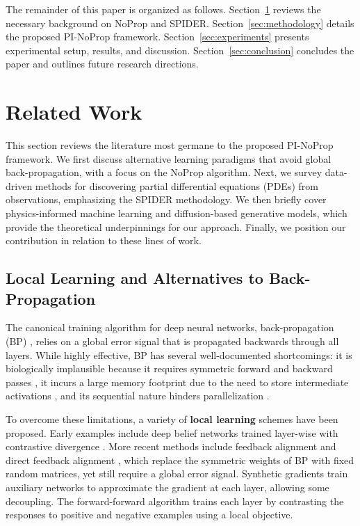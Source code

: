 \documentclass[preprint,12pt]{elsarticle}
\begin{document}
The remainder of this paper is organized as follows. Section~\ref{sec:related} reviews the necessary background on NoProp and SPIDER. Section~\ref{sec:methodology} details the proposed PI-NoProp framework. Section~\ref{sec:experiments} presents experimental setup, results, and discussion. Section~\ref{sec:conclusion} concludes the paper and outlines future research directions.


\section{Related Work}
\label{sec:related}

This section reviews the literature most germane to the proposed PI-NoProp framework. We first discuss alternative learning paradigms that avoid global back-propagation, with a focus on the NoProp algorithm. Next, we survey data-driven methods for discovering partial differential equations (PDEs) from observations, emphasizing the SPIDER methodology. We then briefly cover physics-informed machine learning and diffusion-based generative models, which provide the theoretical underpinnings for our approach. Finally, we position our contribution in relation to these lines of work.

\subsection{Local Learning and Alternatives to Back-Propagation}
\label{sec:local-learning}

The canonical training algorithm for deep neural networks, back-propagation (BP) \cite{rumelhart1986learning}, relies on a global error signal that is propagated backwards through all layers. While highly effective, BP has several well-documented shortcomings: it is biologically implausible because it requires symmetric forward and backward passes \cite{grossberg1987competitive,lillicrap2016random}, it incurs a large memory footprint due to the need to store intermediate activations \cite{rumelhart1986learning}, and its sequential nature hinders parallelization \cite{carreira2014distributed}.

To overcome these limitations, a variety of \textbf{local learning} schemes have been proposed. Early examples include deep belief networks trained layer-wise with contrastive divergence \cite{hinton2006fast}. More recent methods include feedback alignment \cite{lillicrap2016random} and direct feedback alignment \cite{nokland2016direct}, which replace the symmetric weights of BP with fixed random matrices, yet still require a global error signal. Synthetic gradients \cite{jaderberg2017decoupled} train auxiliary networks to approximate the gradient at each layer, allowing some decoupling. The forward-forward algorithm \cite{hinton2022forward} trains each layer by contrasting the responses to positive and negative examples using a local objective.
\end{document}
